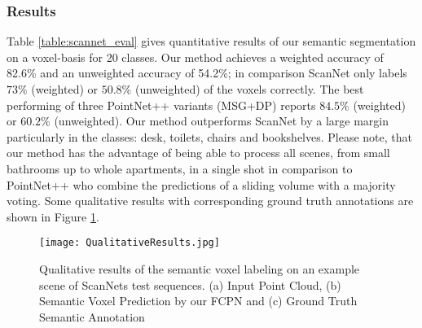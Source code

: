 \documentclass[runningheads]{llncs}
\begin{document}
\subsubsection{Results}

Table \ref{table:scannet_eval} gives quantitative results of our semantic segmentation on a voxel-basis for 20 classes. Our method achieves a weighted accuracy of 82.6\% and an unweighted accuracy of 54.2\%; in comparison ScanNet only labels $73\%$ (weighted) or $50.8\%$ (unweighted) of the voxels correctly. The best performing of three PointNet++ variants (MSG+DP) reports $84.5\%$ (weighted) or $60.2\%$ (unweighted). Our method outperforms ScanNet by a large margin particularly in the classes: desk, toilets, chairs and bookshelves. Please note, that our method has the advantage of being able to process all scenes, from small bathrooms up to whole apartments, in a single shot in comparison to PointNet++ who combine the predictions of a sliding volume with a majority voting. Some qualitative results with corresponding ground truth annotations are shown in Figure \ref{fig:qualitative_results}.

\begin{figure}[h!]
    \centering
 \texttt{[image: QualitativeResults.jpg]}
    \caption{Qualitative results of the semantic voxel labeling on an example scene of ScanNets test sequences. (a) Input Point Cloud, (b) Semantic Voxel Prediction by our FCPN and (c) Ground Truth Semantic Annotation}
    \label{fig:qualitative_results} 
\end{figure}
\newpage

\end{document}
